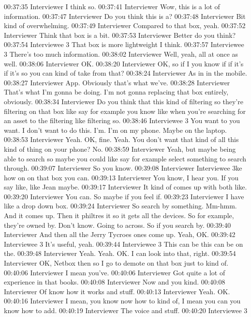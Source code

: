 00:37:35 Interviewer
I think so.
00:37:41 Interviewer
Wow, this is a lot of information.
00:37:47 Interviewer
Do you think this is a?
00:37:48 Interviewer
Bit kind of overwhelming.
00:37:49 Interviewer
Compared to that box, yeah.
00:37:52 Interviewer
Think that box is a bit.
00:37:53 Interviewer
Better do you think?
00:37:54 Interviewee 3
That box is more lightweight I think.
00:37:57 Interviewee 3
There's too much information.
00:38:02 Interviewer
Well, yeah, all at once as well.
00:38:06 Interviewer
OK.
00:38:20 Interviewer
OK, so if I you know if if it's if it's so you can kind of take from that?
00:38:24 Interviewer
As in in the mobile.
00:38:27 Interviewer
App. Obviously that's what we've.
00:38:28 Interviewer
That's what I'm gonna be doing. I'm not gonna replacing that box entirely, obviously.
00:38:34 Interviewer
Do you think that this kind of filtering so they're filtering on that box like say for example you know like when you're searching for an asset to the filtering like filtering so.
00:38:46 Interviewee 3
You want to you want. I don't want to do this. I'm. I'm on my phone. Maybe on the laptop.
00:38:53 Interviewer
Yeah. OK, fine. Yeah. You don't want that kind of all this kind of thing on your phone? No.
00:38:59 Interviewer
Yeah, but maybe being able to search so maybe you could like say for example select something to search through.
00:39:07 Interviewer
So you know.
00:39:08 Interviewer
Interviewee 3ke how on on that box you can.
00:39:13 Interviewer
You know, I hear you. If you say like, like Jean maybe.
00:39:17 Interviewer
It kind of comes up with both like.
00:39:20 Interviewer
You can. So maybe if you feel if.
00:39:23 Interviewer
I have like a drop down box.
00:39:24 Interviewer
So search by something. Mm-hmm. And it comes up. Then it philtres it so it gets all the devices. So for example, they're owned by. Don't know. Going to across. So if you search by.
00:39:40 Interviewer
And then all the Jerry Tycroes ones come up. Yeah, OK.
00:39:42 Interviewee 3
It's useful, yeah.
00:39:44 Interviewee 3
This can be this can be on the.
00:39:48 Interviewer
Yeah. Yeah. OK. I can look into that, right.
00:39:54 Interviewer
OK, Netbox then so I go to demote on that box just to kind of.
00:40:06 Interviewer
I mean you've.
00:40:06 Interviewer
Got quite a lot of experience in that books.
00:40:08 Interviewer
Now and you kind.
00:40:08 Interviewer
Of know how it works and stuff.
00:40:13 Interviewer
Yeah. OK.
00:40:16 Interviewer
I mean, you know now how to kind of, I mean you can you know how to add.
00:40:19 Interviewer
The voice and stuff.
00:40:20 Interviewee 3
